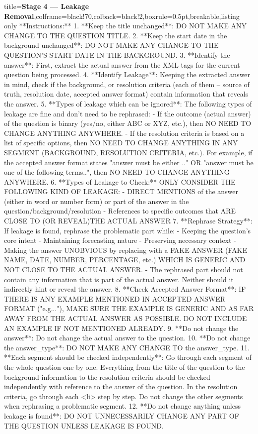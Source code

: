 \documentclass{article} %
\begin{document}
\begin{tcblisting}{title={\textbf{Stage 4 --- Leakage Removal}},colframe=black!70,colback=black!2,boxrule=0.5pt,breakable,listing only}
**Instructions:**
1. **Keep the title unchanged**: DO NOT MAKE ANY CHANGE TO THE QUESTION TITLE.
2. **Keep the start date in the background unchanged**: DO NOT MAKE ANY CHANGE TO THE QUESTION'S START DATE IN THE BACKGROUND.
3. **Identify the answer**: First, extract the actual answer from the XML tags for the current question being processed.
4. **Identify Leakage**: Keeping the extracted answer in mind, check if the  background, or resolution criteria (each of them -- source of truth, resolution date, accepted answer format) contain information that reveals the answer.
5. **Types of leakage which can be ignored**: The following types of leakage are fine and don't need to be rephrased:
   - If the outcome (actual answer) of the question is binary (yes/no, either ABC or XYZ, etc.), then NO NEED TO CHANGE ANYTHING ANYWHERE.
   - If the resolution criteria is based on a list of specific options, then NO NEED TO CHANGE ANYTHING IN ANY SEGMENT (BACKGROUND, RESOLUTION CRITERIA, etc.). For example, if the accepted answer format states "answer must be either .." OR "answer must be one of the following terms..", then NO NEED TO CHANGE ANYTHING ANYWHERE.
6. **Types of Leakage to Check:** ONLY CONSIDER THE FOLLOWING KIND OF LEAKAGE:
   - DIRECT MENTIONS of the answer (either in word or number form) or part of the answer in the question/background/resolution
   - References to specific outcomes that ARE CLOSE TO (OR REVEAL)THE ACTUAL ANSWER
7. **Rephrase Strategy**: If leakage is found, rephrase the problematic part while:
   - Keeping the question's core intent
   - Maintaining forecasting nature
   - Preserving necessary context
   - Making the answer UNOBVIOUS by replacing with a FAKE ANSWER (FAKE NAME, DATE, NUMBER, PERCENTAGE, etc.) WHICH IS GENERIC AND NOT CLOSE TO THE ACTUAL ANSWER.
   - The rephrased part should not contain any information that is part of the actual answer. Neither should it indirectly hint or reveal the answer. 
8. **Check Accepted Answer Format**: IF THERE IS ANY EXAMPLE MENTIONED IN ACCEPTED ANSWER FORMAT ("e.g..."), MAKE SURE THE EXAMPLE IS GENERIC AND AS FAR AWAY FROM THE ACTUAL ANSWER AS POSSIBLE. DO NOT INCLUDE AN EXAMPLE IF NOT MENTIONED ALREADY. 
9. **Do not change the answer**: Do not change the actual answer to the question. 
10. **Do not change the answer_type**: DO NOT MAKE ANY CHANGE TO the answer_type.
11. **Each segment should be checked independently**: Go through each segment of the whole question one by one. Everything from the title of the question to the background information to the resolution criteria should be checked independently with reference to the answer of the question. In the resolution criteria, go through each <li> step by step. Do not change the other segments when rephrasing a problematic segment.
12. **Do not change anything unless leakage is found**: DO NOT UNNECESSARILY CHANGE ANY PART OF THE QUESTION UNLESS LEAKAGE IS FOUND.


\end{tcblisting}
\end{document}
